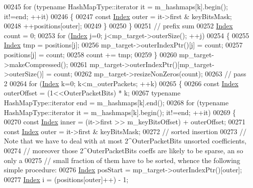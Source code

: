 \begin{DoxyCode}
00245           \textcolor{keywordflow}{for} (\textcolor{keyword}{typename} HashMapType::iterator it = m\_hashmaps[k].begin(); it!=end; ++it)
00246           \{
00247             \textcolor{keyword}{const} \hyperlink{namespace_eigen_a62e77e0933482dafde8fe197d9a2cfde}{Index} outer = it->first & keyBitsMask;
00248             ++positions[outer];
00249           \}
00250         \}
00251         \textcolor{comment}{// prefix sum}
00252         \hyperlink{namespace_eigen_a62e77e0933482dafde8fe197d9a2cfde}{Index} count = 0;
00253         \textcolor{keywordflow}{for} (\hyperlink{namespace_eigen_a62e77e0933482dafde8fe197d9a2cfde}{Index} j=0; j<mp\_target->outerSize(); ++j)
00254         \{
00255           \hyperlink{namespace_eigen_a62e77e0933482dafde8fe197d9a2cfde}{Index} tmp = positions[j];
00256           mp\_target->outerIndexPtr()[j] = count;
00257           positions[j] = count;
00258           count += tmp;
00259         \}
00260         mp\_target->makeCompressed();
00261         mp\_target->outerIndexPtr()[mp\_target->outerSize()] = count;
00262         mp\_target->resizeNonZeros(count);
00263         \textcolor{comment}{// pass 2}
00264         \textcolor{keywordflow}{for} (\hyperlink{namespace_eigen_a62e77e0933482dafde8fe197d9a2cfde}{Index} k=0; k<m\_outerPackets; ++k)
00265         \{
00266           \textcolor{keyword}{const} \hyperlink{namespace_eigen_a62e77e0933482dafde8fe197d9a2cfde}{Index} outerOffset = (1<<OuterPacketBits) * k;
00267           \textcolor{keyword}{typename} HashMapType::iterator end = m\_hashmaps[k].end();
00268           \textcolor{keywordflow}{for} (\textcolor{keyword}{typename} HashMapType::iterator it = m\_hashmaps[k].begin(); it!=end; ++it)
00269           \{
00270             \textcolor{keyword}{const} \hyperlink{namespace_eigen_a62e77e0933482dafde8fe197d9a2cfde}{Index} inner = (it->first >> m\_keyBitsOffset) + outerOffset;
00271             \textcolor{keyword}{const} \hyperlink{namespace_eigen_a62e77e0933482dafde8fe197d9a2cfde}{Index} outer = it->first & keyBitsMask;
00272             \textcolor{comment}{// sorted insertion}
00273             \textcolor{comment}{// Note that we have to deal with at most 2^OuterPacketBits unsorted coefficients,}
00274             \textcolor{comment}{// moreover those 2^OuterPacketBits coeffs are likely to be sparse, an so only a}
00275             \textcolor{comment}{// small fraction of them have to be sorted, whence the following simple procedure:}
00276             \hyperlink{namespace_eigen_a62e77e0933482dafde8fe197d9a2cfde}{Index} posStart = mp\_target->outerIndexPtr()[outer];
00277             \hyperlink{namespace_eigen_a62e77e0933482dafde8fe197d9a2cfde}{Index} i = (positions[outer]++) - 1;

\end{DoxyCode}
